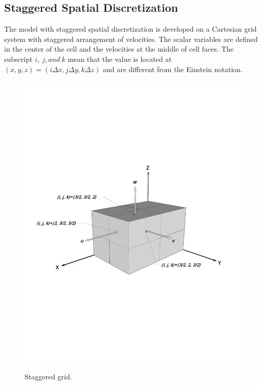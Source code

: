 \normalsize
\subsection{Staggered Spatial Discretization}
The model with staggered spatial discretization is developed on a Cartesian grid system with staggered arrangement of velocities. The scalar variables are defined in the center of the cell and the velocities at the middle of cell faces. The subscript
$i, \ j, and \ k$ mean that the value is located at $(x,y,z)=(  i
\Delta x, j \Delta y, k \Delta z )$ and are different from the Einstein notation.
\begin{figure}[h]
\hspace{0.1in}
\includegraphics[width=5.6in]{../figures/Staggered/Staggered3D.pdf}
\label{fig:Staggered3D}
\caption{Staggered grid.}
\end{figure}

